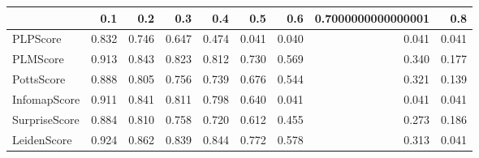 \begin{tabular}{lrrrrrrrr}
\toprule
{} &   0.1 &   0.2 &   0.3 &   0.4 &   0.5 &   0.6 & 0.7000000000000001 &   0.8 \\
\midrule
PLPScore      & 0.832 & 0.746 & 0.647 & 0.474 & 0.041 & 0.040 &              0.041 & 0.041 \\
PLMScore      & 0.913 & 0.843 & 0.823 & 0.812 & 0.730 & 0.569 &              0.340 & 0.177 \\
PottsScore    & 0.888 & 0.805 & 0.756 & 0.739 & 0.676 & 0.544 &              0.321 & 0.139 \\
InfomapScore  & 0.911 & 0.841 & 0.811 & 0.798 & 0.640 & 0.041 &              0.041 & 0.041 \\
SurpriseScore & 0.884 & 0.810 & 0.758 & 0.720 & 0.612 & 0.455 &              0.273 & 0.186 \\
LeidenScore   & 0.924 & 0.862 & 0.839 & 0.844 & 0.772 & 0.578 &              0.313 & 0.041 \\
\bottomrule
\end{tabular}
